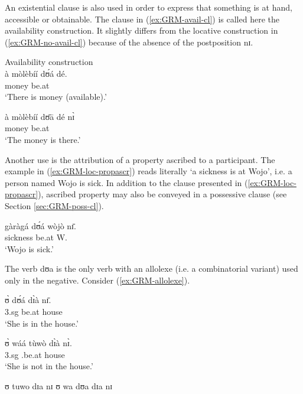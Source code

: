 An existential clause is also used in order to express that something is at
hand, accessible or obtainable. The clause in (\ref{ex:GRM-avail-cl}) is called
here 
the availability construction. It slightly differs from the
locative
construction in (\ref{ex:GRM-no-avail-cl}) because of  the absence of the
postposition
{\sls nɪ}.

\ea\label{ex:GRM-avail-vs-loc}

\ea\label{ex:GRM-avail-cl}{\rm Availability construction}\\

\gll à mòlèbíí dʊ́á dé.\\
{\art}  money be.at {\dem}\\
\glt  `There is money (available).'

\ex\label{ex:GRM-no-avail-cl}
\gll à mòlèbíí dʊ̄ā dé nɪ̀\\
{\art}  money be.at {\dem}  {\postp}\\
\glt `The money is there.'

\z 
 \z


Another use is the attribution of a property ascribed to a participant. The
example in (\ref{ex:GRM-loc-propascr}) reads literally `a sickness is at Wojo', 
i.e. a person named Wojo is sick.  In addition to the clause presented in
(\ref{ex:GRM-loc-propascr}), ascribed property may also be conveyed in a
possessive clause (see Section \ref{sec:GRM-poss-cl}). 


\ea\label{ex:GRM-loc-propascr}
\gll gàràgá dʊ́á wòjò nɪ̄.\\
sickness be.at W. {\postp}\\
\glt  `Wojo is sick.'
\z

 The
verb {\sls dʊa} is the only verb with an allolexe (i.e. a combinatorial 
variant) used only in the 
negative.
Consider (\ref{ex:GRM-allolexe}).

\ea\label{ex:GRM-allolexe}

\ea\label{ex:GRM-allolexe-pos}
\gll ʊ̀  dʊ́á dɪ̀à nɪ̄.\\
{\sc 3.sg} be.at house {\postp}\\
\glt  `She is in the house.'

\ex\label{ex:GRM-allolexe-neg}
\gll ʊ̀  wáá tùwò dɪ̀à nɪ̀.\\
{\sc 3.sg} {\neg} {\neg}.be.at house {\postp}\\
\glt  `She is not in the house.'


\ex\label{ex:GRM-allolexe-pos-out}
 \textasteriskcentered ʊ  tuwo dɪa nɪ
\ex\label{ex:GRM-allolexe-neg-out}
 \textasteriskcentered ʊ  wa dʊa dɪa nɪ

